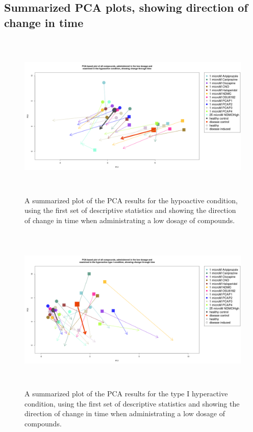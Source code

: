 \documentclass[a4paper,12pt]{article}
\begin{document}
\subsection{Summarized PCA plots, showing direction of change in time}
\begin{figure}[h!]
\begin{center}
\includegraphics[width=16cm,height=8cm]{All_together_1_microM_DarkApoLow_in_time.png}
\caption{A summarized plot of the PCA results for the hypoactive condition, using the first set of descriptive statistics and showing the direction of change in time when administrating a low dosage of compounds.}
\end{center}
\end{figure}
\newpage
\begin{figure}[h!]
\begin{center}
\includegraphics[width=16cm,height=8cm]{All_together_1_microM_DarkApoHigh_in_time.png}
\caption{A summarized plot of the PCA results for the type I hyperactive condition, using the first set of descriptive statistics and showing the direction of change in time when administrating a low dosage of compounds.}
\end{center}
\end{figure}
\end{document}
